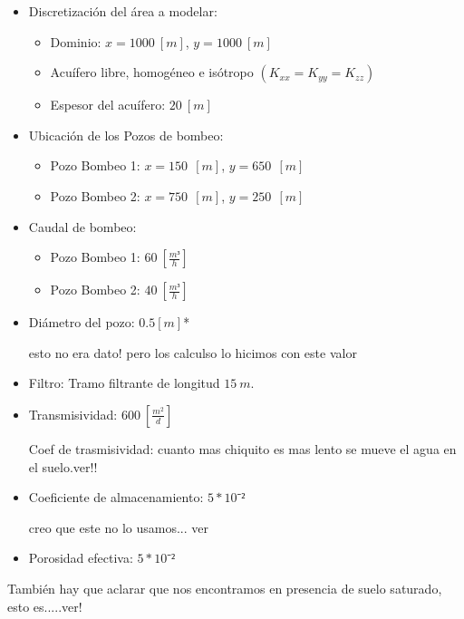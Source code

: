 \documentclass[10pt,a4paper,final]{article}
\begin{document}
\begin{itemize}
	\item Discretización del área a modelar:	
	\begin{itemize}
		\item Dominio: $x=1000 ~\left[m\right]$, $y=1000 ~\left[m\right]$
		\item Acuífero libre, homogéneo e isótropo $(K_{xx} = K_{yy} = K_{zz})$
		\item Espesor del acuífero: $20 ~\left[m\right]$
	\end{itemize}
	\item Ubicación de los Pozos de bombeo:
	\begin{itemize}
		\item Pozo Bombeo 1: $x=150~~\left[m\right]$, $y=650 ~~\left[m\right]$
		\item Pozo Bombeo 2: $x=750~~\left[m\right]$, $y=250 ~~\left[m\right]$
	\end{itemize}
	\item Caudal de bombeo:
	\begin{itemize}
		\item Pozo Bombeo 1: $60~\left[\frac{m³}{h}\right]$
		\item Pozo Bombeo 2: $40~\left[\frac{m³}{h}\right]$
	\end{itemize}
	\item Diámetro del pozo: $0.5 [m]$* \begin{Large} esto no era dato! pero los calculso lo hicimos con este valor \end{Large}
	\item Filtro: Tramo filtrante de longitud $15~m.$
	\item Transmisividad: $600~\left[\frac{m^2}{d}\right]$\\
\begin{LARGE}
Coef de trasmisividad: cuanto mas chiquito es mas lento se mueve el agua en el suelo.ver!! \\
\end{LARGE}	
	\item Coeficiente de almacenamiento: $5*10⁻²$ \begin{LARGE}
	creo que este no lo usamos... ver
	\end{LARGE}
	\item Porosidad efectiva: $5*10⁻²$
\end{itemize}
\begin{Large}
También hay que aclarar que nos encontramos en presencia de suelo saturado, esto es.....ver!\\
\end{Large}
\end{document}
